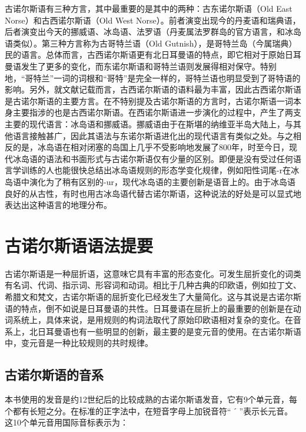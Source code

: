 古诺尔斯语有三种方言，其中最重要的是其中的两种：古东诺尔斯语（Old East Norse）和古西诺尔斯语（Old West Norse）。前者演变出现今的丹麦语和瑞典语，后者演变出今天的挪威语、冰岛语、法罗语（丹麦属法罗群岛的官方语言，和冰岛语类似）。第三种方言称为古哥特兰语（Old Gutnish），是哥特兰岛（今属瑞典）民的语言。总体而言，古西诺尔斯语更有北日耳曼语的特点，即它相对于原始日耳曼语发生了更多的变化，而东诺尔斯语和哥特兰语则发展得相对保守。特别地，“哥特兰”一词的词根和“哥特”是完全一样的，哥特兰语也明显受到了哥特语的影响。另外，就文献记载而言，古西诺尔斯语的语料最为丰富，因此古西诺尔斯语是古诺尔斯语的主要方言。在不特别提及古诺尔斯语的方言时，古诺尔斯语一词本身主要指涉的也是古西诺尔斯语。在西诺尔斯语进一步演化的过程中，产生了两支主要的现代语言：冰岛语和挪威语。挪威语由于在斯堪的纳维亚半岛大陆上，与其他语言接触甚广，因此其语法与东诺尔斯语进化出的现代语言有类似之处。与之相反的是，冰岛语在相对闭塞的岛国上几乎不受影响地发展了800年，时至今日，现代冰岛语的语法和书面形式与古诺尔斯语仅有少量的区别。即便是没有受过任何语言学训练的人也能很快总结出冰岛语规则的形态学变化规律，例如阳性词尾-r在冰岛语中演化为了稍有区别的-ur，现代冰岛语的主要创新是语音上的。由于冰岛语良好的从古性，有时也用古冰岛语代替古诺尔斯语，这种说法的好处是可以显式地表达出这种语言的地理分布。

\section*{古诺尔斯语语法提要}

古诺尔斯语是一种屈折语，这意味它具有丰富的形态变化。可发生屈折变化的词类有名词、代词、指示词、形容词和动词。相比于几种古典的印欧语，例如拉丁文、希腊文和梵文，古诺尔斯语的屈折变化已经发生了大量简化。这与其说是古诺尔斯语的特点，倒不如说是日耳曼语的共性。日耳曼语在屈折上的最重要的创新是在动词系统上，具体来说，是用规则的构词法取代了原始印欧语相对复杂的变化。在音系上，北日耳曼语也有一些明显的创新，最主要的是变元音的使用。在古诺尔斯语中，变元音是一种比较规则的共时规律。

\subsection*{古诺尔斯语的音系}
本书使用的发音是约12世纪后的比较成熟的古诺尔斯语发音，它有9个单元音，每个都有长短之分。在标准的正字法中，在短音字母上加锐音符“ ˊ ”表示长元音。
这10个单元音用国际音标表示为：


